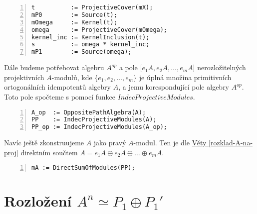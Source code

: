       \begin{Verbatim}[frame=single,numbers=left]
t          := ProjectiveCover(mX);
mP0        := Source(t);          
mOmega     := Kernel(t);
omega      := ProjectiveCover(mOmega);
kernel_inc := KernelInclusion(t); 
s          := omega * kernel_inc;  
mP1        := Source(omega);
       \end{Verbatim}
       
       Dále budeme potřebovat algebru $A^{op}$ a pole [$e_1A,e_2A,\ldots,e_mA$] nerozložitelných 
       projektivních $A$-modulů, kde $\{e_1,e_2,\ldots,e_m\}$ je úplná množina 
       primitivních ortogonálních idempotentů algebry $A$, a jemu korespondující 
       pole algebry $A^{op}$. Toto pole spočteme s pomocí funkce 
       $IndecProjectiveModules$.
       
      \begin{Verbatim}[frame=single,numbers=left]
A_op  := OppositePathAlgebra(A);
PP    := IndecProjectiveModules(A);
PP_op := IndecProjectiveModules(A_op);
      \end{Verbatim}
      
      Navíc ještě zkonstruujeme $A$ jako pravý $A$-modul. Ten je dle 
      \hyperref[rozklad-A-na-proj]{Věty \ref*{rozklad-A-na-proj}} direktním součtem 
      $A=e_1A\oplus e_2A\oplus \ldots \oplus e_mA$.
    
      \begin{Verbatim}[frame=single,numbers=left]
mA := DirectSumOfModules(PP);      
    \end{Verbatim}
    
    

  \section{Rozložení $A^n\simeq P_1\oplus P_1'$}
  
      
